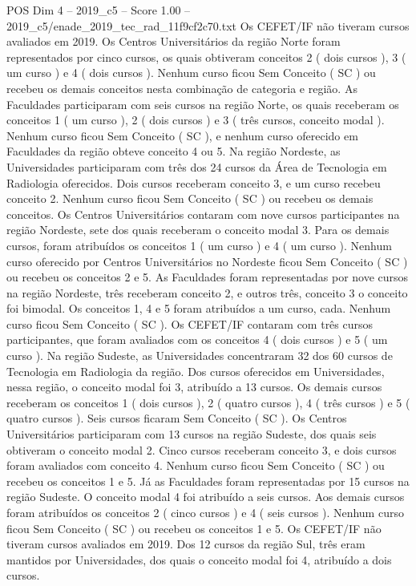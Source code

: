 \begin{textsample}{POS Dim 4 – 2019\_c5 – Score 1.00 – 2019\_c5/enade\_2019\_tec\_rad\_11f9cf2c70.txt}
Os CEFET/IF não tiveram cursos avaliados em 2019.
Os Centros Universitários da região Norte foram representados por cinco cursos, os quais obtiveram conceitos 2 ( dois cursos ), 3 ( um curso ) e 4 ( dois cursos ).
Nenhum curso ficou Sem Conceito ( SC ) ou recebeu os demais conceitos nesta combinação de categoria e região.
As Faculdades participaram com seis cursos na região Norte, os quais receberam os conceitos 1 ( um curso ), 2 ( dois cursos ) e 3 ( três cursos, conceito modal ).
Nenhum curso ficou Sem Conceito ( SC ), e nenhum curso oferecido em Faculdades da região obteve conceito 4 ou 5.
Na região Nordeste, as Universidades participaram com três dos 24 cursos da Área de Tecnologia em Radiologia oferecidos.
Dois cursos receberam conceito 3, e um curso recebeu conceito 2.
Nenhum curso ficou Sem Conceito ( SC ) ou recebeu os demais conceitos.
Os Centros Universitários contaram com nove cursos participantes na região Nordeste, sete dos quais receberam o conceito modal 3.
Para os demais cursos, foram atribuídos os conceitos 1 ( um curso ) e 4 ( um curso ).
Nenhum curso oferecido por Centros Universitários no Nordeste ficou Sem Conceito ( SC ) ou recebeu os conceitos 2 e 5.
As Faculdades foram representadas por nove cursos na região Nordeste, três receberam conceito 2, e outros três, conceito 3 o conceito foi bimodal.
Os conceitos 1, 4 e 5 foram atribuídos a um curso, cada.
Nenhum curso ficou Sem Conceito ( SC ).
Os CEFET/IF contaram com três cursos participantes, que foram avaliados com os conceitos 4 ( dois cursos ) e 5 ( um curso ).
Na região Sudeste, as Universidades concentraram 32 dos 60 cursos de Tecnologia em Radiologia da região.
Dos cursos oferecidos em Universidades, nessa região, o conceito modal foi 3, atribuído a 13 cursos.
Os demais cursos receberam os conceitos 1 ( dois cursos ), 2 ( quatro cursos ), 4 ( três cursos ) e 5 ( quatro cursos ).
Seis cursos ficaram Sem Conceito ( SC ).
Os Centros Universitários participaram com 13 cursos na região Sudeste, dos quais seis obtiveram o conceito modal 2.
Cinco cursos receberam conceito 3, e dois cursos foram avaliados com conceito 4.
Nenhum curso ficou Sem Conceito ( SC ) ou recebeu os conceitos 1 e 5.
Já as Faculdades foram representadas por 15 cursos na região Sudeste.
O conceito modal 4 foi atribuído a seis cursos.
Aos demais cursos foram atribuídos os conceitos 2 ( cinco cursos ) e 4 ( seis cursos ).
Nenhum curso ficou Sem Conceito ( SC ) ou recebeu os conceitos 1 e 5.
Os CEFET/IF não tiveram cursos avaliados em 2019.
Dos 12 cursos da região Sul, três eram mantidos por Universidades, dos quais o conceito modal foi 4, atribuído a dois cursos.

\end{textsample}
